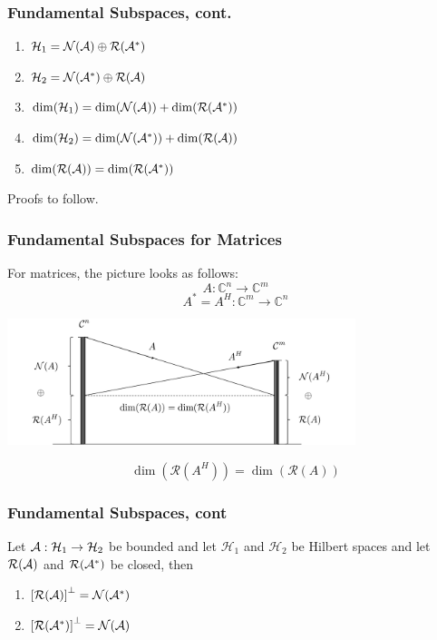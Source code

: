 \documentclass{beamer}
\begin{document}
\begin{frame}\frametitle{Fundamental Subspaces, cont.}
	\begin{lemma}
		\begin{enumerate}
		\item $\mathcal{H}_1 = \mathcal{N}(\mathcal{A}) \oplus \mathcal{R}(\mathcal{A}^\ast)$
		\item $\mathcal{H}_2 = \mathcal{N}(\mathcal{A}^\ast) \oplus \mathcal{R}(\mathcal{A})$
		\item $\dim(\mathcal{H}_1) = \dim(\mathcal{N}(\mathcal{A})) + \dim(\mathcal{R}(\mathcal{A}^\ast))$
		\item $\dim(\mathcal{H}_2) = \dim(\mathcal{N}(\mathcal{A}^\ast)) + \dim(\mathcal{R}(\mathcal{A}))$\\
		\item $\dim(\mathcal{R}(\mathcal{A})) = \dim(\mathcal{R}(\mathcal{A}^\ast))$
		\end{enumerate}
	\end{lemma}
	
	Proofs to follow.
	
\end{frame}

\begin{frame}\frametitle{Fundamental Subspaces for Matrices}
	For matrices, the picture looks as follows:
	\[ A:\mathbb{C}^n \to \mathbb{C}^m \]
	\[ A^\ast = A^H: \mathbb{C}^m \to \mathbb{C}^n\]
	\begin{center}
		\includegraphics[width=4in]{figures/chap4_fundamental_subspace_matrices}
	\end{center}
	\[\dim(\mathcal{R}(A^H)) = \dim(\mathcal{R}(A))\]
\end{frame}

\begin{frame}\frametitle{Fundamental Subspaces, cont}
	\begin{theorem}	
		Let $\mathcal{A}: \mathcal{H}_1 \to \mathcal{H}_2$ be bounded and let $\mathcal{H}_1$ and $\mathcal{H}_2$ be Hilbert spaces and let $\mathcal{R}(\mathcal{A})$ and $\mathcal{R}(\mathcal{A}^\ast)$ be closed, then
		\begin{enumerate}
		\item $\left[ \mathcal{R}(\mathcal{A}) \right]^{\perp} = \mathcal{N}(\mathcal{A}^\ast) $
		\item $\left[ \mathcal{R}(\mathcal{A}^\ast) \right]^{\perp} = \mathcal{N}(\mathcal{A}) $
		\end{enumerate}	
	\end{theorem}
\end{frame}
\end{document}
